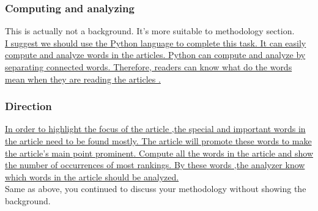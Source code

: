 \subsubsection*{Computing and analyzing}
This is actually not a background. It's more suitable to methodology section.\\ \underline{I suggest we should use the Python language to complete this task. It can easily compute and analyze words in the articles. Python can compute and analyze by separating connected words. Therefore, readers can know what do the words mean when they are reading the articles .}

\subsubsection*{Direction}
\underline{In order to highlight the focus of the article ,the special and important words in the article need to be found mostly. The article will promote these words to make the article's main point prominent. Compute all the words in the article and show the number of occurrences of most rankings. By these words ,the analyzer know which words in the article should be analyzed.}\\
Same as above, you continued to discuss your methodology without showing the background. 
